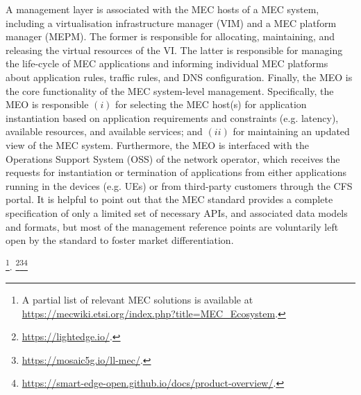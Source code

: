 A management layer is associated with the MEC hosts of a MEC system, including a virtualisation infrastructure manager (VIM) and a MEC platform manager (MEPM). The former is responsible for allocating, maintaining, and releasing the virtual resources of the VI. The latter is responsible for managing the life-cycle of MEC applications and informing individual MEC platforms about application rules, traffic rules, and DNS configuration. Finally, the MEO is the core functionality of the MEC system-level management. Specifically, the MEO is responsible $(i)$ for selecting the MEC host(s) for application instantiation based on application requirements and constraints (e.g. latency), available resources, and available services; and $(ii)$ for maintaining an updated view of the MEC system. Furthermore, the MEO is interfaced with the Operations Support System (OSS) of the network operator, which receives the requests for instantiation or termination of applications from either applications running in the devices (e.g. UEs) or from third-party customers through the CFS portal. It is helpful to point out that the MEC standard provides a complete specification of only a limited set of necessary APIs, and associated data models and formats, but most of the management reference points are voluntarily left open by the standard to foster market differentiation. 

\footnote{A partial list of relevant MEC solutions is available at \url{https://mecwiki.etsi.org/index.php?title=MEC_Ecosystem}.}. \footnote{\url{https://lightedge.io/}.}\footnote{\url{https://mosaic5g.io/ll-mec/}.}\footnote{\url{https://smart-edge-open.github.io/docs/product-overview/}.}  
